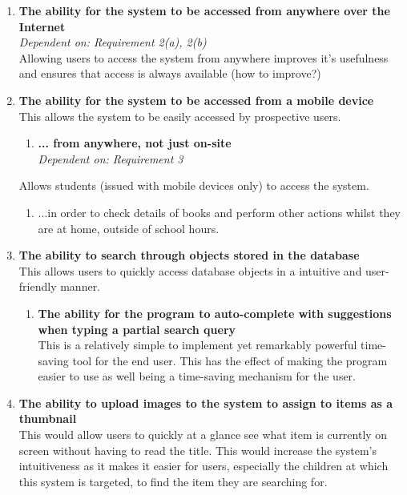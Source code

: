 \documentclass[../../../main.tex]{subfiles}
\begin{document}
\begin{enumerate}
      \item \textbf{The ability for the system to be accessed from anywhere over the Internet}\\
            \textit{Dependent on: Requirement 2(a), 2(b)}\\
            Allowing users to access the system from anywhere improves it's usefulness and ensures that access is always available (how to improve?)

      \item \textbf{The ability for the system to be accessed from a mobile device}\\
            This allows the system to be  easily accessed by prospective users.\\
            \begin{enumerate}
                  \item \textbf{... from anywhere, not just on-site}\\
                        \textit{Dependent on: Requirement 3}
            \end{enumerate}


            Allows students (issued with mobile devices only) to access the system.
            \begin{enumerate}
                  \item ...in order to check details of books and perform other actions whilst they are at home, outside of school hours.
            \end{enumerate}

      \item \textbf{The ability to search through objects stored in the database}\\
            This allows users to quickly access database objects in a intuitive and user-friendly manner.

            \begin{enumerate}
                  \item \textbf{The ability for the program to auto-complete with suggestions when typing a partial search query}\\
                        This is a relatively simple to implement yet remarkably powerful time-saving tool for the end user.
                        This has the effect of making the program easier to use as well being a time-saving mechanism for the user.
            \end{enumerate}

      \item \textbf{The ability to upload images to the system to assign to items as a thumbnail}\\
            This would allow users to quickly at a glance see what item is currently on screen without having to read the title.
            This would increase the system's intuitiveness as it makes it easier for users, especially the children at which this system
            is targeted, to find the item they are searching for.
\end{enumerate}
\end{document}
